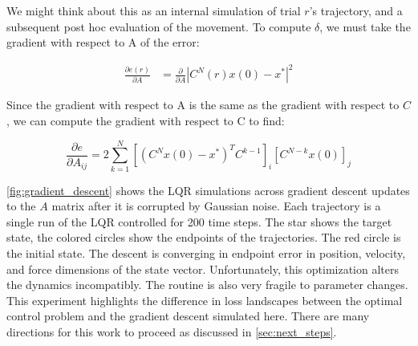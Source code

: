 \documentclass[
  a4paper,
]{article}
\begin{document}
We might think about this as an internal simulation of trial \(r\)'s
trajectory, and a subsequent post hoc evaluation of the movement. To
compute \(\delta\), we must take the gradient with respect to A of the
error:

\[
\begin{aligned}
\frac{\partial{e(r)}}{\partial{A}} &= \frac{\partial{}}{\partial{A}}{|C^N(r)x(0) - x^*|^2}
\end{aligned}
\]

Since the gradient with respect to A is the same as the gradient with
respect to \(C\), we can compute the gradient with respect to C to find:

\[
\frac{\partial{e}}{\partial{A_{ij}}} = 2\sum_{k=1}^N\left[(C^Nx(0) - x^*)^TC^{k-1}\right]_i\left[C^{N-k}x(0)\right]_j
\]

\cref{fig:gradient_descent} shows the LQR simulations across gradient
descent updates to the \(A\) matrix after it is corrupted by Gaussian
noise. Each trajectory is a single run of the LQR controlled for 200
time steps. The star shows the target state, the colored circles show
the endpoints of the trajectories. The red circle is the initial state.
The descent is converging in endpoint error in position, velocity, and
force dimensions of the state vector. Unfortunately, this optimization
alters the dynamics incompatibly. The routine is also very fragile to
parameter changes. This experiment highlights the difference in loss
landscapes between the optimal control problem and the gradient descent
simulated here. There are many directions for this work to proceed as
discussed in \cref{sec:next_steps}.
\end{document}
